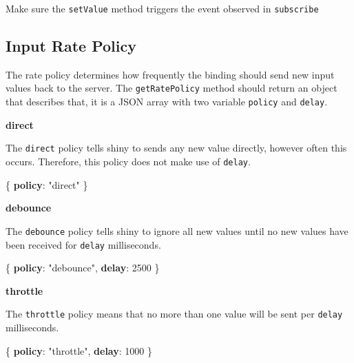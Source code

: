 \documentclass[
]{krantz}
\makeatletter
\newenvironment{Shaded}{\begin{snugshade}}{\end{snugshade}}
\newcommand{\DecValTok}[1]{\textcolor[rgb]{0.06,0.06,0.06}{#1}}
\newcommand{\ErrorTok}[1]{\textcolor[rgb]{0.14,0.14,0.14}{\textbf{#1}}}
\newcommand{\FunctionTok}[1]{\textcolor[rgb]{0,0,0}{#1}}
\newcommand{\StringTok}[1]{\textcolor[rgb]{0.5,0.5,0.5}{#1}}
\newenvironment{kframe}{%
\medskip{}
\setlength{\fboxsep}{.8em}
 \def\at@end@of@kframe{}%
 \ifinner\ifhmode%
  \def\at@end@of@kframe{\end{minipage}}%
  \begin{minipage}{\columnwidth}%
 \fi\fi%
 \def\FrameCommand##1{\hskip\@totalleftmargin \hskip-\fboxsep
 \colorbox{shadecolor}{##1}\hskip-\fboxsep
     \hskip-\linewidth \hskip-\@totalleftmargin \hskip\columnwidth}%
 \MakeFramed {\advance\hsize-\width
   \@totalleftmargin\z@ \linewidth\hsize
   \@setminipage}}%
 {\par\unskip\endMakeFramed%
 \at@end@of@kframe}
\renewenvironment{Shaded}{\begin{kframe}}{\end{kframe}}
\newenvironment{rmdblock}[1]
  {
  \begin{itemize}
  \renewcommand{\labelitemi}{
    \raisebox{-.7\height}[0pt][0pt]{
      {\setkeys{Gin}{width=3em,keepaspectratio}\texttt{[image: images/\#1]}}
    }
  }
  \setlength{\fboxsep}{1em}
  \begin{kframe}
  \item
  }
  {
  \end{kframe}
  \end{itemize}
  }
\newenvironment{rmdnote}
  {\begin{rmdblock}{note}}
  {\end{rmdblock}}
\makeatother
\begin{document}
\begin{rmdnote}
Make sure the \texttt{setValue} method triggers the event observed in
\texttt{subscribe}
\end{rmdnote}

\hypertarget{shiny-input-rate-policy}{%
\subsection{Input Rate Policy}\label{shiny-input-rate-policy}}

The rate policy determines how frequently the binding should send new input values back to the server. The \texttt{getRatePolicy} method should return an object that describes that, it is a JSON array with two variable \texttt{policy} and \texttt{delay}.

\textbf{direct}

The \texttt{direct} policy tells shiny to sends any new value directly, however often this occurs. Therefore, this policy does not make use of \texttt{delay}.

\begin{Shaded}
\begin{Highlighting}[]
\FunctionTok{\{}
  \ErrorTok{policy}\FunctionTok{:} \StringTok{"direct"}
\FunctionTok{\}}
\end{Highlighting}
\end{Shaded}

\textbf{debounce}

The \texttt{debounce} policy tells shiny to ignore all new values until no new values have been received for \texttt{delay} milliseconds.

\begin{Shaded}
\begin{Highlighting}[]
\FunctionTok{\{}
  \ErrorTok{policy}\FunctionTok{:} \StringTok{"debounce"}\FunctionTok{,}
  \ErrorTok{delay}\FunctionTok{:} \DecValTok{2500}
\FunctionTok{\}}
\end{Highlighting}
\end{Shaded}

\textbf{throttle}

The \texttt{throttle} policy means that no more than one value will be sent per \texttt{delay} milliseconds.

\begin{Shaded}
\begin{Highlighting}[]
\FunctionTok{\{}
  \ErrorTok{policy}\FunctionTok{:} \StringTok{"throttle"}\FunctionTok{,}
  \ErrorTok{delay}\FunctionTok{:} \DecValTok{1000}
\FunctionTok{\}}
\end{Highlighting}
\end{Shaded}
\end{document}
